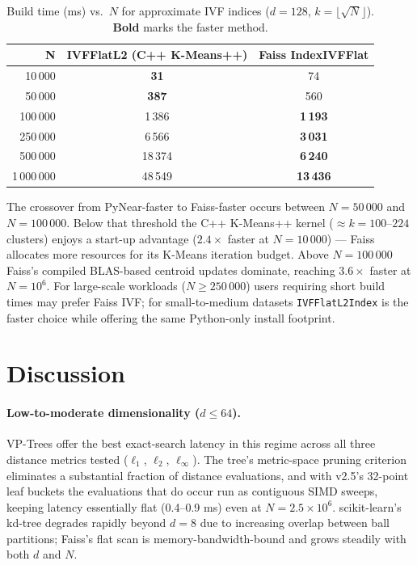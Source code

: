 \documentclass[11pt,a4paper]{article}
\begin{document}
\begin{table}[h]
\centering
\caption{Build time (ms) vs.\ $N$ for approximate IVF indices ($d=128$,
  $k=\lfloor\sqrt{N}\rfloor$).  \textbf{Bold} marks the faster method.}
\label{tab:build-scale}
\renewcommand{\arraystretch}{1.25}
\begin{tabular}{rcc}
\toprule
\textbf{N} & \textbf{IVFFlatL2 (C++ K-Means++)} & \textbf{Faiss IndexIVFFlat} \\
\midrule
10\,000  & \textbf{31}    & 74    \\
50\,000  & \textbf{387}   & 560   \\
100\,000 & 1\,386  & \textbf{1\,193}  \\
250\,000 & 6\,566  & \textbf{3\,031}  \\
500\,000 & 18\,374 & \textbf{6\,240}  \\
1\,000\,000 & 48\,549 & \textbf{13\,436} \\
\bottomrule
\end{tabular}
\end{table}

The crossover from PyNear-faster to Faiss-faster occurs between $N=50\,000$
and $N=100\,000$.  Below that threshold the C++ K-Means++ kernel
($\approx k=100\text{--}224$ clusters) enjoys a start-up advantage
($2.4\times$ faster at $N=10\,000$) — Faiss
allocates more resources for its K-Means iteration budget.  Above $N=100\,000$
Faiss's compiled BLAS-based centroid updates dominate, reaching
$3.6\times$ faster at $N=10^6$.
For large-scale workloads ($N \ge 250\,000$) users requiring short build
times may prefer Faiss IVF; for small-to-medium datasets \texttt{IVFFlatL2Index}
is the faster choice while offering the same Python-only install footprint.

\section{Discussion}
\label{sec:discussion}

\paragraph{Low-to-moderate dimensionality ($d \leq 64$).}
VP-Trees offer the best exact-search latency in this regime across all three
distance metrics tested ($\ell_1$, $\ell_2$, $\ell_\infty$).  The tree's
metric-space pruning criterion eliminates a substantial fraction of distance
evaluations, and with v2.5's 32-point leaf buckets the evaluations that do
occur run as contiguous SIMD sweeps, keeping latency essentially flat
(0.4--0.9 ms) even at $N = 2.5\times10^6$.
scikit-learn's kd-tree degrades rapidly beyond $d = 8$ due to increasing
overlap between ball partitions; Faiss's flat scan is memory-bandwidth-bound
and grows steadily with both $d$ and $N$.
\end{document}
